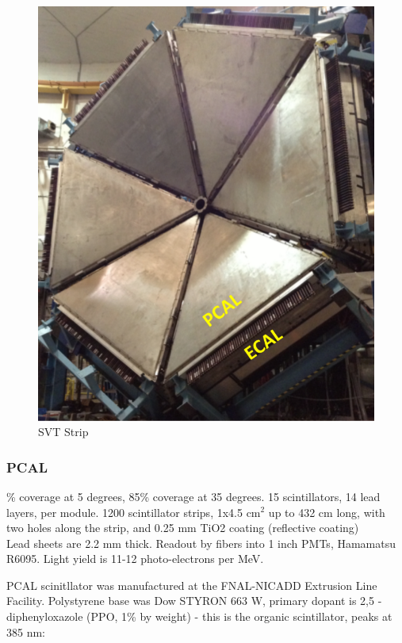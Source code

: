 			 \begin{figure}[H]
    			\centering
    			\includegraphics[width=12cm]{CLAS-12/modules/clas-12-system/pics/fd/clas12-pcal-ecal.PNG}
    			\caption{SVT Strip}
			\end{figure}
			
			
            \subsubsection{PCAL}
                \% coverage at 5 degrees, 85\% coverage at 35 degrees. 15 scintillators, 14 lead layers, per module. 1200 scintillator strips, 1x4.5 cm$^2$ up to 432 cm long, with two holes along the strip, and 0.25 mm TiO2 coating (reflective coating)\\
                Lead sheets are 2.2 mm thick. Readout by fibers into 1 inch PMTs, Hamamatsu R6095. Light yield is 11-12 photo-electrons per MeV. 
                
                PCAL scinitllator was manufactured at the FNAL-NICADD Extrusion Line Facility. Polystyrene base was Dow STYRON 663 W, primary dopant is 2,5 -diphenyloxazole (PPO, 1\% by weight) - this is the organic scintillator, peaks at 385 nm:
                
